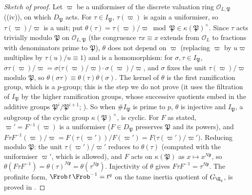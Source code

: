 \begin{proof}[Sketch of proof]
Let $\varpi$ be a uniformiser of the discrete valuation ring $\mathcal O_{L,\mathfrak P}$ ((iv)), on which $D_{\mathfrak P}$ acts. For
$\tau\in I_{\mathfrak P}$, $\tau(\varpi)$ is again a uniformiser, so $\tau(\varpi)/\varpi$ is a unit; put $\theta(\tau)=\tau(\varpi)/\varpi\bmod\mathfrak P
\in\kappa(\mathfrak P)^\times$. Since $\tau$ acts trivially modulo $\mathfrak P$ on $\mathcal O_{L,\mathfrak P}$ (the congruence $\tau x\equiv x$ extends from
$\mathcal O_L$ to fractions with denominators prime to $\mathfrak P$), $\theta$ does not depend on $\varpi$ (replacing $\varpi$ by $u\varpi$ multiplies by
$\tau(u)/u\equiv1$) and is a homomorphism: for $\sigma,\tau\in I_{\mathfrak P}$,
$\sigma\tau(\varpi)/\varpi=\sigma\bigl(\tau(\varpi)/\varpi\bigr)\cdot\sigma(\varpi)/\varpi$, and $\sigma$ fixes the unit $\tau(\varpi)/\varpi$ modulo $\mathfrak P$, so
$\theta(\sigma\tau)\equiv\theta(\tau)\theta(\sigma)$. The kernel
of $\theta$ is the first ramification group, which is a $p$-group; this is the step we do not prove (it uses the filtration of $I_{\mathfrak P}$ by the
higher ramification groups, whose successive quotients embed in the additive groups $\mathfrak P^i/\mathfrak P^{i+1}$; \cite[Chapter IV, Section 2]{SerreLocalFields}).
So when $\#I_{\mathfrak P}$ is prime to $p$, $\theta$ is injective and $I_{\mathfrak P}$, a subgroup of the cyclic group $\kappa(\mathfrak P)^\times$, is cyclic.
For $F$ as stated, $\varpi'=F^{-1}(\varpi)$ is a uniformiser ($F\in D_{\mathfrak P}$ preserves $\mathfrak P$ and its powers), and
$F\tau F^{-1}(\varpi)/\varpi=F(\tau(\varpi'))/F(\varpi')=F\bigl(\tau(\varpi')/\varpi'\bigr)$. Reducing modulo $\mathfrak P$: the unit $\tau(\varpi')/\varpi'$ reduces to
$\theta(\tau)$ (computed with the uniformiser $\varpi'$, which is allowed), and $F$ acts on $\kappa(\mathfrak P)$ as $x\mapsto x^{N\mathfrak p}$, so
$\theta(F\tau F^{-1})=\theta(\tau)^{N\mathfrak p}=\theta(\tau^{N\mathfrak p})$. Injectivity of $\theta$ gives $F\tau F^{-1}=\tau^{N\mathfrak p}$. The profinite form, $\Frob\,t\,\Frob^{-1}=t^q$ on the tame inertia
quotient of $G_{\Q_q}$, is proved in .
\end{proof}

